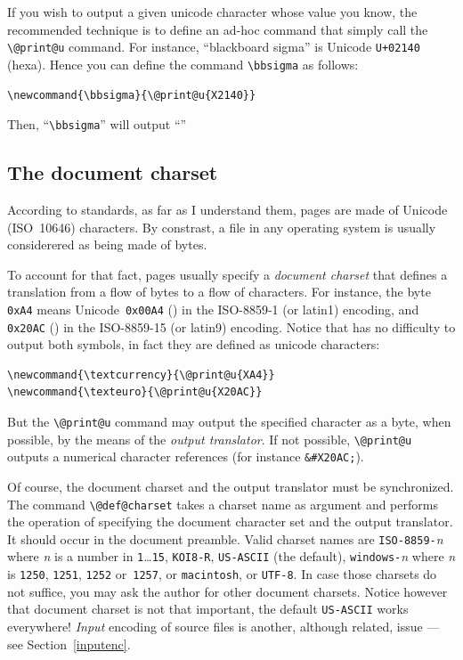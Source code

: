 %
If you wish to output a given unicode character whose value you know,
the recommended technique is to define an ad-hoc command
that simply call the \verb+\@print@u+ command.
For instance, ``blackboard sigma'' is Unicode \texttt{U+02140} (hexa).
Hence you can define the command \verb+\bbsigma+ as follows:
\begin{verbatim}
\newcommand{\bbsigma}{\@print@u{X2140}}
\end{verbatim}
\ifhevea Then, ``\verb+\bbsigma+'' will output ``''\fi


\subsection{The \label{encodings}document charset}
According to standards, as far as I understand them, \html{} pages are
made of Unicode (ISO~10646) characters.
By constrast, a file in any operating system is usually considerered as
being made of bytes.

%
To account for that fact, \html{} pages usually specify a \emph{document
charset} that defines a translation from a flow of bytes to a flow of
characters.
For instance, the byte
\texttt{0xA4} means Unicode~\texttt{0x00A4} (\textcurrency) in the
ISO-8859-1 (or latin1) encoding, and \texttt{0x20AC} (\texteuro) in
the ISO-8859-15 (or latin9) encoding.
Notice that \hevea{} has no difficulty to output both symbols, in fact
they are defined as unicode characters:
\begin{verbatim}
\newcommand{\textcurrency}{\@print@u{XA4}}
\newcommand{\texteuro}{\@print@u{X20AC}}
\end{verbatim}
But the \verb+\@print@u+ command may output the specified character as
a byte, when possible, by the means of the \emph{output translator}.
If not possible, \verb+\@print@u+ outputs a numerical character
references (for instance \verb+&#X20AC;+).

%
Of course, the document charset and the output translator
must be synchronized. The command \verb+\@def@charset+ takes a
charset name as argument and performs the operation of specifying the
document character set and the output translator. It should occur in
the document preamble.
Valid  charset names are \texttt{ISO-8859-}\textit{n} where \textit{n} is a
number in \texttt{1}\ldots\texttt{15},
\texttt{KOI8-R}, \texttt{US-ASCII} (the
default),
\texttt{windows-}\textit{n} where \textit{n} is
\texttt{1250}, \texttt{1251}, \texttt{1252} or~\texttt{1257},
or \texttt{macintosh}, or \texttt{UTF-8}.
In case those charsets do not suffice, you may ask the author for
other document charsets.  Notice however that document charset is not
that important, the default \texttt{US-ASCII} works everywhere!
\emph{Input} encoding of source files is another, although
related, issue --- see Section~\ref{inputenc}.

